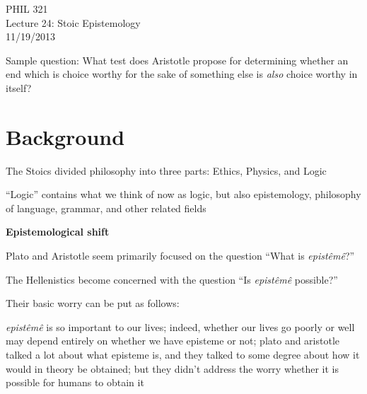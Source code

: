 \documentclass[11pt]{article}
\begin{document}
\thispagestyle{empty}
\begin{center} \LARGE{PHIL 321\\ Lecture 24: Stoic Epistemology}\\ \vspace*{2mm}
\large{11/19/2013}\end{center}
\thispagestyle{empty}\vspace*{3mm}
\vspace*{-8mm}

\noindent Sample question: What test does Aristotle propose for determining whether an end which is choice worthy for the sake of something else is \emph{also} choice worthy in itself?

\section*{Background}

\noindent The Stoics divided philosophy into three parts: Ethics, Physics, and Logic
\vspace*{2mm}

\noindent ``Logic'' contains what we think of now as logic, but also epistemology, philosophy of language, grammar, and other related fields
\vspace*{2mm}

\noindent\textbf{Epistemological shift}

\noindent Plato and Aristotle seem primarily focused on the question ``What is \emph{epist\^{e}m\^{e}}?''
\vspace*{2mm}

\noindent The Hellenistics become concerned with the question ``Is \emph{epist\^{e}m\^{e}} possible?''
\vspace*{2mm}

\noindent Their basic worry can be put as follows: 
\vspace*{2mm}

\emph{epist\^{e}m\^{e}} is so important to our lives; indeed, whether our lives go poorly or well may depend entirely on whether we have episteme or not; plato and aristotle talked a lot about what episteme is, and they talked to some degree about how it would in theory be obtained; but they didn't address the worry whether it is possible for humans to obtain it
\vspace*{2mm}
\end{document}
